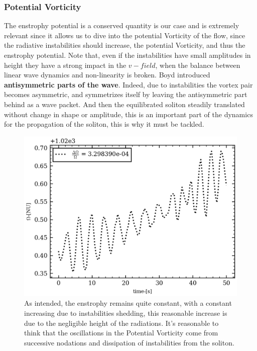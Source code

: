 \documentclass[11pt,a4paper]{report}
\begin{document}
\begin{multicols}{2}
    \subsubsection{Potential Vorticity}
    The enstrophy potential is a conserved quantity is our case and is extremely relevant since it allows us to dive into the potential Vorticity of the flow, since the radiative instabilities should increase, the potential Vorticity, and thus the enstrophy potential.
    Note that, even if the instabilities have small amplitudes in height they have a strong impact in the $v-field$, when the balance between linear wave dynamics and non-linearity is broken. Boyd introduced \textbf{antisymmetric parts of the wave}. Indeed, due to instabilities the vortex pair becomes asymmetric, and
    symmetrizes itself by leaving the antisymmetric part behind as a wave packet. And then the equilibrated soliton steadily translated without change in shape or amplitude, this is an important part of the dynamics for the propagation of the soliton, this is why it must be tackled.

    \begin{figure}[H]
        \centering
        \includegraphics[width=1\linewidth]{./figure/potential_enstrophy.png}
        \caption{As intended, the enstrophy remains quite constant, with a constant increasing due to instabilities shedding, this reasonable increase is due to the negligible height of the radiations. It's reasonable to think that the oscillations in the Potential Vorticity come from
            successive nodations and dissipation of instabilities from the soliton.}
        \label{}
    \end{figure}


\end{multicols}
\end{document}

